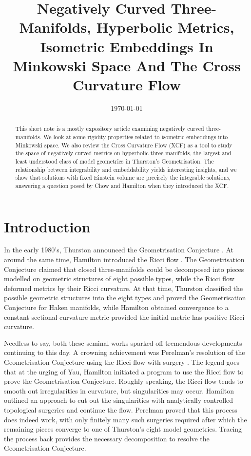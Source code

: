 \documentclass[a4paper,12pt]{amsart}
\begin{document}
\title[Negatively Curved Three Manifolds]{Negatively Curved Three-Manifolds, Hyperbolic Metrics, Isometric Embeddings In Minkowski Space And The Cross Curvature Flow}

\date{\today}



\begin{abstract}
This short note is a mostly expository article examining negatively curved three-manifolds. We look at some rigidity properties related to isometric embeddings into Minkowski space. We also review the Cross Curvature Flow (XCF) as a tool to study the space of negatively curved metrics on hyperbolic three-manifolds, the largest and least understood class of model geometries in Thurston's Geometrisation. The relationship between integrability and embeddability yields interesting insights, and we show that solutions with fixed Einstein volume are precisely the integrable solutions, answering a question posed by Chow and Hamilton when they introduced the XCF.
\end{abstract}

\maketitle

\section{Introduction}
\label{sec:intro}

In the early 1980's, Thurston announced the Geometrisation Conjecture \cite{MR648524}. At around the same time, Hamilton introduced the Ricci flow \cite{Hamilton:/1982}. The Geometrisation Conjecture claimed that closed three-manifolds could be decomposed into pieces modelled on geometric structures of eight possible types, while the Ricci flow deformed metrics by their Ricci curvature. At that time, Thurston classified the possible geometric structures into the eight types and proved the Geometrisation Conjecture for Haken manifolds, while Hamilton obtained convergence to a constant sectional curvature metric provided the initial metric has positive Ricci curvature.

Needless to say, both these seminal works sparked off tremendous developments continuing to this day. A crowning achievement was Perelman's resolution of the Geometrisation Conjecture using the Ricci flow with surgery \cite{2003math......7245P,2003math......3109P,2002math.....11159P}. The legend goes that at the urging of Yau, Hamilton initiated a program to use the Ricci flow to prove the Geometrisation Conjecture. Roughly speaking, the Ricci flow  tends to smooth out irregularities in curvature, but singularities may occur. Hamilton outlined an approach to cut out the singularities with analytically controlled topological surgeries and continue the flow. Perelman proved that this process does indeed work, with only finitely many such surgeries required after which the remaining pieces converge to one of Thurston's eight model geometries. Tracing the process back provides the necessary decomposition to resolve the Geometrisation Conjecture.
\end{document}
